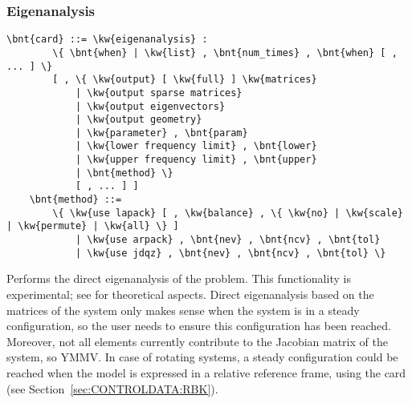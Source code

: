 \subsubsection{Eigenanalysis}
\label{sec:IVP:eigenanalysis}
\begin{Verbatim}[commandchars=\\\{\}]
    \bnt{card} ::= \kw{eigenanalysis} :
        \{ \bnt{when} | \kw{list} , \bnt{num_times} , \bnt{when} [ , ... ] \}
        [ , \{ \kw{output} [ \kw{full} ] \kw{matrices}
            | \kw{output sparse matrices}
            | \kw{output eigenvectors}
            | \kw{output geometry}
            | \kw{parameter} , \bnt{param}
            | \kw{lower frequency limit} , \bnt{lower}
            | \kw{upper frequency limit} , \bnt{upper}
            | \bnt{method} \}
            [ , ... ] ]
    \bnt{method} ::=
        \{ \kw{use lapack} [ , \kw{balance} , \{ \kw{no} | \kw{scale} | \kw{permute} | \kw{all} \} ]
            | \kw{use arpack} , \bnt{nev} , \bnt{ncv} , \bnt{tol}
            | \kw{use jdqz} , \bnt{nev} , \bnt{ncv} , \bnt{tol} \} 
\end{Verbatim}
Performs the direct eigenanalysis of the problem.
This functionality is experimental;
see \cite{MASARATI-2009} for theoretical aspects.
Direct eigenanalysis based on the matrices of the system
only makes sense when the system is in a steady configuration,
so the user needs to ensure this configuration has been reached.
Moreover, not all elements currently contribute to the Jacobian
matrix of the system, so YMMV.
In case of rotating systems, a steady configuration could be reached
when the model is expressed in a relative reference frame,
using the  card
(see Section~\ref{sec:CONTROLDATA:RBK}).

